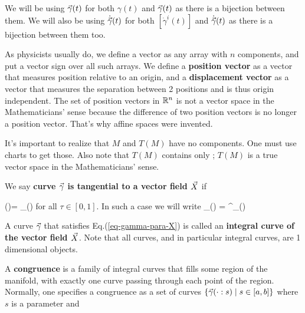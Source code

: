 \beq
{}
\eeq
We will be using
${\vec{\gamma}}(t)$ for both 
$\gamma(t)$ and ${\vec{\gamma}}(t)$ as 
there is a bijection between them. We will also be using
$\dot{{\vec{\gamma}}}(t)$ for
both $[\dot{\gamma}^i(t)]$
and $\dot{{\vec{\gamma}}}(t)$
as there is a bijection between them too.

As physicists usually do, we define
a vector as any array with $n$
components, and put a vector
sign over all such arrays.
We define
 a {\bf position vector} as a vector that 
measures position relative to an origin,
and a {\bf displacement vector}
as a vector that measures
the separation between 2 positions and is thus origin independent.
The set of position vectors in ${ \mathbb{R}}^n$ is not a vector space 
in the Mathematicians' sense because
the difference of two position vectors is no
longer a position vector.
That's why affine spaces
were invented.

It's important to realize that $M$ and
$T(M)$ 
have no components.
One must use charts to get those.
Also note that 
$T(M)$ 
contains only
; $T(M)$ is a true vector space in the Mathematicians' sense.


We say {\bf curve ${\vec{\gamma}}$ is tangential to a vector field ${\vec{X}}$} if

\beq
\dot{\vgamma}(\tau)=
\vecX_{\vgamma(\tau)}
\label{eq-gamma-para-X}
\eeq
for all  $\tau\in[0,1]$.
In such a case we will write
\beq
\vecX_{\vgamma(\tau)} = \vecX^{\para \vgamma}_{\vgamma(\tau)}
\eeq

A curve ${\vec{\gamma}}$ that
satisfies Eq.(\ref{eq-gamma-para-X})
is called an {\bf integral curve
of the vector field ${\vec{X}}$}.
Note that all curves, and in particular 
integral curves,
are 1 dimensional objects.

A {\bf congruence} is a family of integral curves that fills some region of the manifold, with exactly one curve passing through each point of the region.
Normally, one 
specifies a 
congruence as a 
set of curves
$\{{\vec{\gamma}}(\cdot: s)\mid s\in [a, b]\}$
where $s$ is a parameter and

